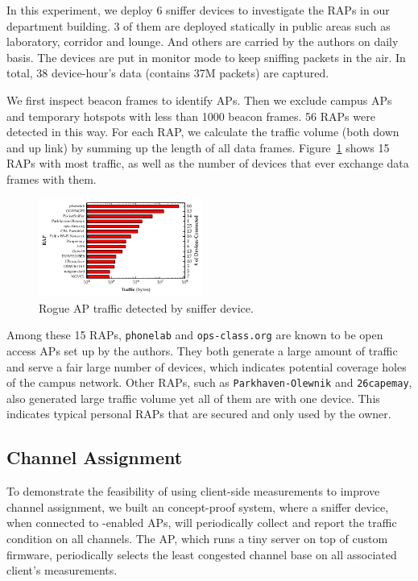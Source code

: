 In this experiment, we deploy 6 sniffer devices to investigate the RAPs in our
department building.  3 of them are deployed statically in public areas such as
laboratory, corridor and lounge. And others are carried by the authors on daily
basis. The devices are put in monitor mode to keep sniffing packets in the air.
In total, 38 device-hour's data (contains 37M packets) are captured.  

We first inspect beacon frames to identify APs. Then we exclude campus APs and
temporary hotspots with less than 1000 beacon frames. 56 RAPs were
detected in this way. For each RAP, we calculate the traffic volume (both
down and up link) by summing up the length of all data frames.
Figure~\ref{fig:rap} shows 15 RAPs with most traffic, as well as the number of
devices that ever exchange data frames with them.

\begin{figure}[t!]
  \centering
  \includegraphics[width=0.48\textwidth]{./figures/RAPTrafficGraph.pdf}
  \caption{Rogue AP traffic detected by sniffer device.}
  \label{fig:rap}
\end{figure}

Among these 15 RAPs, \texttt{phonelab} and \texttt{ops-class.org} are known to
be open access APs set up by the authors.  They both generate a large amount of
traffic and serve a fair large number of devices, which indicates potential
coverage holes of the campus network. Other RAPs, such as
\texttt{Parkhaven-Olewnik} and \texttt{26capemay}, also generated large traffic
volume yet all of them are with one device. This indicates typical personal RAPs
that are secured and only used by the owner.


\subsection{Channel Assignment}


To demonstrate the feasibility of using client-side measurements to improve
channel assignment, we built an concept-proof system, where a sniffer device,
when connected to \PS{}-enabled APs, will periodically collect
and report the traffic condition on all channels. The AP, which runs a tiny 
server on top of custom firmware, periodically selects the least congested
channel base on all associated client's measurements.

